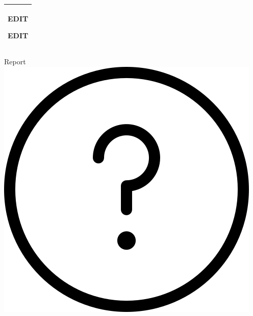 %
\begin{titlepage}
  \addtolength{\hoffset}{0.5\evensidemargin-0.5\oddsidemargin} %
  \noindent%
  \begin{tabular}{@{}p{\textwidth}@{}}
    \toprule[2pt]
    \midrule
    \vspace{0.2cm}
    \begin{center}
    \Huge{\textbf{
     EDIT %
    }}
    \end{center}
    \begin{center}
      \Large{
    EDIT %
      }
    \end{center}
    \vspace{0.2cm}\\
    \midrule
    \toprule[2pt]
  \end{tabular}
  \vspace{4 cm}
  \begin{center}
    {\large
      Report%
    }\\
    \vspace{0.2cm}
    {\Large
      \includegraphics[width=.7\textwidth]{figs/question-mark-button.png}%
    }
  \end{center}
  \vfill
  \begin{center}

  \end{center}
\end{titlepage}
\clearpage
